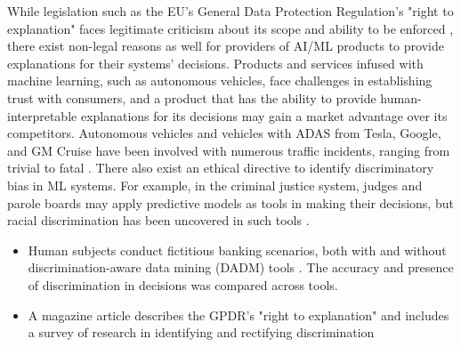 While legislation such as the EU's General Data Protection Regulation's "right to explanation" faces legitimate criticism about its scope and ability to be enforced \cite{10.1093/idpl/ipx005}, there exist non-legal reasons as well for providers of AI/ML products to provide explanations for their systems' decisions.  Products and services infused with machine learning, such as autonomous vehicles, face challenges in establishing trust with consumers, and a product that has the ability to provide human-interpretable explanations for its decisions may gain a market advantage over its competitors.  Autonomous vehicles and vehicles with ADAS from Tesla, Google, and GM Cruise have been involved with numerous traffic incidents, ranging from trivial to fatal \cite{Read2016} \cite{Tesla2018} \cite{Ackerman2016} \cite{Bhavsar2017}.  There also exist an ethical directive to identify discriminatory bias in ML systems.  For example, in the criminal justice system, judges and parole boards may apply predictive models as tools in making their decisions, but racial discrimination has been uncovered in such tools \cite{Wexler.2017} \cite{Angwin2016}.

\begin{itemize}
    \item Human subjects conduct fictitious banking scenarios, both with and without discrimination-aware data mining (DADM) tools \cite{Berendt2014}.  The accuracy and presence of discrimination in decisions was compared across tools.

    \item A magazine article describes the GPDR's "right to explanation" and includes a survey of research in identifying and rectifying discrimination \cite{Goodman2017EuropeanUR}
\end{itemize}

